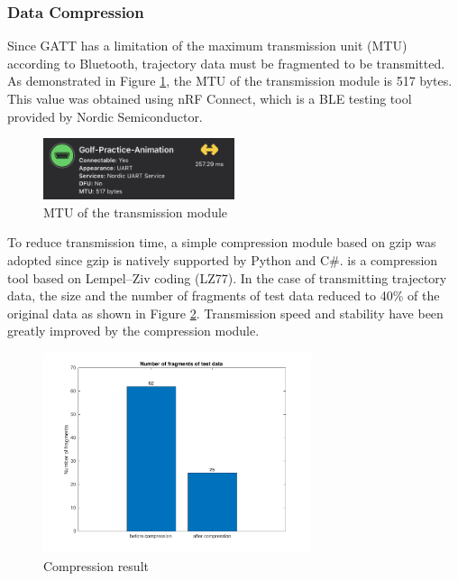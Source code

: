 \subsubsection{Data Compression}
Since GATT has a limitation of the maximum transmission unit (MTU) according to Bluetooth, trajectory data must be fragmented to be transmitted. As demonstrated in Figure \ref{fig:mtu}, the MTU of the transmission module is 517 bytes. This value was obtained using nRF Connect, which is a BLE testing tool provided by Nordic Semiconductor.
\begin{figure}[H]
    \centering
    \includegraphics[width=0.5\textwidth]{figure/mtu.png}
    \caption{MTU of the transmission module}
    \label{fig:mtu}
\end{figure}
To reduce transmission time, a simple compression module based on gzip was adopted since gzip is natively supported by Python and C\#. \textcite{gzip} is a compression tool based on Lempel–Ziv coding (LZ77). In the case of transmitting trajectory data, the size and the number of fragments of test data reduced to 40\% of the original data as shown in Figure \ref{fig:compress}. Transmission speed and stability have been greatly improved by the compression module.
\begin{figure}[H]
    \centering
    \includegraphics[width=0.7\textwidth]{figure/compression.pdf}
    \caption{Compression result}
    \label{fig:compress}
\end{figure}


